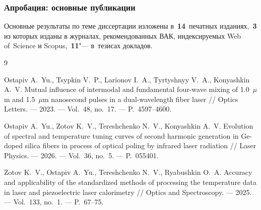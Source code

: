 \begin{frame} %
    \frametitle{Апробация: основные публикации}
    Основные результаты по теме диссертации изложены в~\textbf{14}~печатных изданиях,~\textbf{3} из которых изданы в журналах, рекомендованных ВАК, индексируемых Web of~Science и Scopus,~\textbf{11}"--- в~тезисах докладов.
%        

	\begin{thebibliography}{9}
		
		Ostapiv A.~Yu., Tsypkin V.~P., Larionov I.~A., Tyrtyshnyy V.~A., Konyashkin A.~V.
		Mutual influence of intermodal and fundamental four-wave mixing of 1.0~$\mu$m and 1.5~$\mu$m nanosecond pulses in a dual-wavelength fiber laser //
		Optics Letters. --- 2023. --- Vol.~48, no.~17. --- P.~4597--4600.
		
		Ostapiv A.~Yu., Zotov K.~V., Tereshchenko N.~V., Konyashkin A.~V.
		Evolution of spectral and temperature tuning curves of second harmonic generation in Ge-doped silica fibers in process of optical poling by infrared laser radiation //
		Laser Physics. --- 2026. --- Vol.~36, no.~5. --- P.~055401.
		
		Zotov K.~V., Ostapiv A.~Yu., Tereshchenko N.~V., Ryabushkin O.~A.
		Accuracy and applicability of the standardized methods of processing the temperature data in laser and piezoelectric laser calorimetry //
		Optics and Spectroscopy. --- 2025. --- Vol.~133, no.~1. --- P.~67--75.
		
	\end{thebibliography}

\end{frame}

